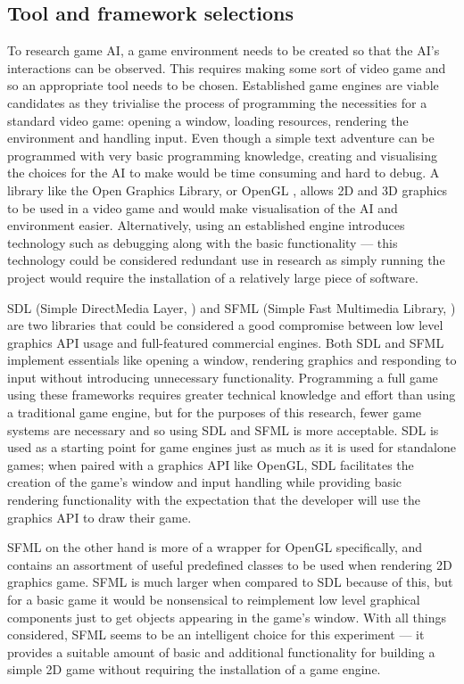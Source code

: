 \documentclass[11pt, a4paper]{report}
\begin{document}
\subsection{Tool and framework selections}
\label{subsec:toolAndFrameworkSelections}

To research game AI, a game environment needs to be created so that the AI's interactions can be observed. This requires making some sort of video game and so an appropriate tool needs to be chosen. Established game engines are viable candidates as they trivialise the process of programming the necessities for a standard video game: opening a window, loading resources, rendering the environment and handling input. Even though a simple text adventure can be programmed with very basic programming knowledge, creating and visualising the choices for the AI to make would be time consuming and hard to debug. A library like the Open Graphics Library, or OpenGL \parencite{OpenGL}, allows 2D and 3D graphics to be used in a video game and would make visualisation of the AI and environment easier. Alternatively, using an established engine introduces technology such as debugging along with the basic functionality --- this technology could be considered redundant use in research as simply running the project would require the installation of a relatively large piece of software.

SDL (Simple DirectMedia Layer, \cite{SDL}) and SFML (Simple Fast Multimedia Library, \cite{SFML}) are two libraries that could be considered a good compromise between low level graphics API usage and full-featured commercial engines. Both SDL and SFML implement essentials like opening a window, rendering graphics and responding to input without introducing unnecessary functionality. Programming a full game using these frameworks requires greater technical knowledge and effort than using a traditional game engine, but for the purposes of this research, fewer game systems are necessary and so using SDL and SFML is more acceptable. SDL is used as a starting point for game engines just as much as it is used for standalone games; when paired with a graphics API like OpenGL, SDL facilitates the creation of the game's window and input handling while providing basic rendering functionality with the expectation that the developer will use the graphics API to draw their game. 

SFML on the other hand is more of a wrapper for OpenGL specifically, and contains an assortment of useful predefined classes to be used when rendering 2D graphics game. SFML is much larger when compared to SDL because of this, but for a basic game it would be nonsensical to reimplement low level graphical components just to get objects appearing in the game's window. With all things considered, SFML seems to be an intelligent choice for this experiment --- it provides a suitable amount of basic and additional functionality for building a simple 2D game without requiring the installation of a game engine.
\end{document}
